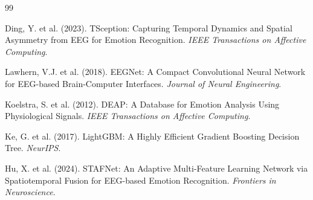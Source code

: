 \documentclass[12pt,a4paper]{ctexrep}
\begin{document}

\begin{thebibliography}{99}

Ding, Y. et al. (2023).
TSception: Capturing Temporal Dynamics and Spatial Asymmetry from EEG for Emotion Recognition.
\textit{IEEE Transactions on Affective Computing}.

Lawhern, V.J. et al. (2018).
EEGNet: A Compact Convolutional Neural Network for EEG-based Brain-Computer Interfaces.
\textit{Journal of Neural Engineering}.

Koelstra, S. et al. (2012).
DEAP: A Database for Emotion Analysis Using Physiological Signals.
\textit{IEEE Transactions on Affective Computing}.

Ke, G. et al. (2017).
LightGBM: A Highly Efficient Gradient Boosting Decision Tree.
\textit{NeurIPS}.

Hu, X. et al. (2024).
STAFNet: An Adaptive Multi-Feature Learning Network via Spatiotemporal Fusion for EEG-based Emotion Recognition.
\textit{Frontiers in Neuroscience}.

\end{thebibliography}
\end{document}

